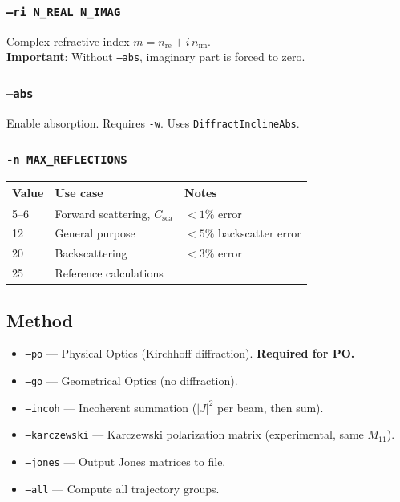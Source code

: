 \documentclass[11pt,a4paper]{article}
\begin{document}
\subsubsection{\texttt{--ri N\_REAL N\_IMAG}}
Complex refractive index $m = n_\text{re} + i\,n_\text{im}$.\\
\textbf{Important}: Without \texttt{--abs}, imaginary part is forced to zero.

\subsubsection{\texttt{--abs}}
Enable absorption. Requires \texttt{-w}. Uses \texttt{DiffractInclineAbs}.

\subsubsection{\texttt{-n MAX\_REFLECTIONS}}

\begin{tabular}{lll}
\toprule
Value & Use case & Notes \\
\midrule
5--6  & Forward scattering, $C_\text{sca}$ & $<1\%$ error \\
12    & General purpose & $<5\%$ backscatter error \\
20    & Backscattering & $<3\%$ error \\
25    & Reference calculations & \\
\bottomrule
\end{tabular}

\subsection{Method}

\begin{itemize}
\item \texttt{--po} --- Physical Optics (Kirchhoff diffraction). \textbf{Required for PO.}
\item \texttt{--go} --- Geometrical Optics (no diffraction).
\item \texttt{--incoh} --- Incoherent summation ($|J|^2$ per beam, then sum).
\item \texttt{--karczewski} --- Karczewski polarization matrix (experimental, same $M_{11}$).
\item \texttt{--jones} --- Output Jones matrices to file.
\item \texttt{--all} --- Compute all trajectory groups.
\end{itemize}
\end{document}
